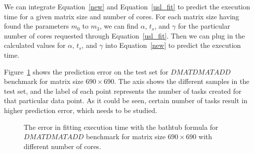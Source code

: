 \vspace{\baselineskip}	
We can integrate Equation~\ref{new} and Equation~\ref{usl_fit} to predict the execution time for a given matrix size and number of cores.
For each matrix size having found the parameters $m_0$ to $m_3$, we can find $\alpha$, $t_s$, and $\gamma$ for the particular number of cores requested through Equation~\ref{usl_fit}. Then we can plug in the calculated values for $\alpha$, $t_s$, and $\gamma$ into Equation~\ref{new} to predict the execution time.

Figure~\ref{fig25} shows the prediction error on the test set for $DMATDMATADD$ benchmark for matrix size $690\times690$. The axis shows the different samples in the test set, and the label of each point represents the number of tasks created for that particular data point. As it could be seen, certain number of tasks result in higher prediction error, which needs to be studied.


\vspace{\baselineskip}	
\begin{figure}[H]
	\caption{The error in fitting execution time with the bathtub formula for $DMATDMATADD$ benchmark for matrix size $690\times690$ with different number of cores.}	
	\label{fig25}
\end{figure}



\vspace{\baselineskip}	 